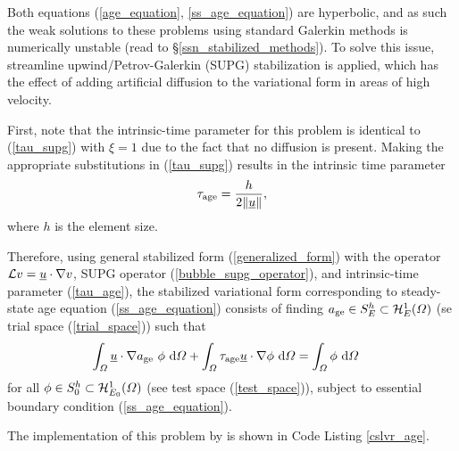 Both equations (\ref{age_equation}, \ref{ss_age_equation}) are hyperbolic, and as such the weak solutions to these problems using standard Galerkin methods is numerically unstable (read to \S \ref{ssn_stabilized_methods}).  To solve this issue, streamline upwind/Petrov-Galerkin (SUPG) stabilization \citep{brooks_1982} is applied, which has the effect of adding artificial diffusion to the variational form in areas of high velocity.

First, note that the intrinsic-time parameter for this problem is identical to (\ref{tau_supg}) with $\xi = 1$ due to the fact that no diffusion is present.  Making the appropriate substitutions in (\ref{tau_supg}) results in the intrinsic time parameter 
\begin{align}
  \label{tau_age}
  \tau_{\text{age}} = \frac{h}{2 \Vert \underline{u} \Vert},
\end{align}
where $h$ is the element size.

Therefore, using general stabilized form (\ref{generalized_form}) with the operator $\mathcal{L} v = \underline{u} \cdot \nabla v$, SUPG operator (\ref{bubble_supg_operator}), and intrinsic-time parameter (\ref{tau_age}), the stabilized variational form corresponding to steady-state age equation (\ref{ss_age_equation}) consists of finding $a_{\text{ge}} \in S_E^h \subset \mathcal{H}_E^1(\varOmega)$ (se trial space (\ref{trial_space})) such that
\begin{align}
  \label{age_variational_form_intermediate}
  \int_{\varOmega} \underline{u} \cdot \nabla a_{\text{ge}}\ \phi \ \mathrm{d}\varOmega + \int_{\varOmega} \tau_{\text{age}} \underline{u} \cdot \nabla \phi \ \mathrm{d}\varOmega &= \int_{\varOmega} \phi \ \mathrm{d}\varOmega
\end{align}
for all $\phi \in S_0^h \subset \mathcal{H}_{E_0}^1(\varOmega)$ (see test space (\ref{test_space})), subject to essential boundary condition (\ref{ss_age_equation}).

The implementation of this problem by \CSLVR is shown in Code Listing \ref{cslvr_age}.



